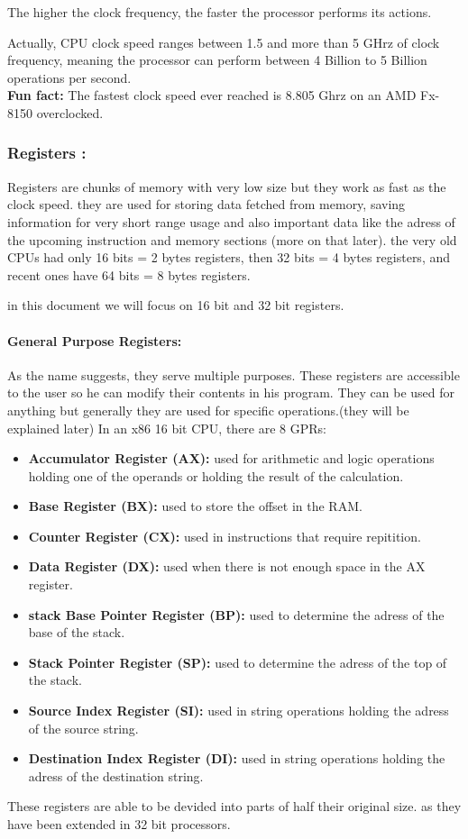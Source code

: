 \documentclass[10pt]{article}
\begin{document}
    The higher the clock frequency, the faster the processor performs its actions.
    
    Actually, CPU clock speed ranges between 1.5 and more than 5 GHrz of clock frequency, 
    meaning the processor can perform between 4 Billion to 5 Billion operations per second.
    \\\textbf{Fun fact: }The fastest clock speed ever reached is 8.805 Ghrz on an AMD Fx-8150 overclocked.

    \subsubsection{Registers :}
    \tabto{20pt}Registers are chunks of memory with very low size but they work as fast as the clock speed. 
    they are used for storing data fetched from memory, 
    saving information for very short range usage and also important data like the adress of the upcoming instruction and memory sections (more on that later).
    the very old CPUs had only 16 bits = 2 bytes registers, then 32 bits = 4 bytes registers, and recent ones have 
    64 bits = 8 bytes registers.

    in this document we will focus on 16 bit and 32 bit registers.
    \paragraph{General Purpose Registers: }As the name suggests, they serve multiple purposes.
    These registers are accessible to the user so he can modify their contents in his program.
    They can be used for anything but generally they are used for specific operations.(they will be explained later)
    In an x86 16 bit CPU, there are 8 GPRs: 
    \begin{itemize}
        \item \textbf{Accumulator Register (AX):}  used for arithmetic and logic operations holding one of the operands or holding the result of the calculation.
        \item \textbf{Base Register (BX):}  used to store the offset in the RAM.
        \item \textbf{Counter Register (CX):}  used in instructions that require repitition.
        \item \textbf{Data Register (DX):}  used when there is not enough space in the AX register.
        \item \textbf{stack Base Pointer Register (BP):}  used to determine the adress of the base of the stack.
        \item \textbf{Stack Pointer Register (SP):}  used to determine the adress of the top of the stack.
        \item \textbf{Source Index Register (SI):}  used in string operations holding the adress of the source string.
        \item \textbf{Destination Index Register (DI):}  used in string operations holding the adress of the destination string.
    \end{itemize}
    These registers are able to be devided into parts of half their original size. as they have been extended in 32 bit processors.
\end{document}
